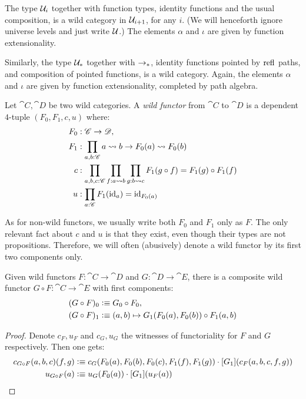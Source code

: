 \documentclass[english,a4paper]{lmcs}
\begin{document}
\begin{exa}
  The type $\mathcal{U}_i$ together with function types, identity functions and the
	usual composition, is a wild category in $\mathcal{U}_{i+1}$, for any $i$. (We will henceforth ignore universe levels and just write $\mathcal{U}$.) The elements $\alpha$ and $\iota$ are
  given by function extensionality.

  Similarly, the type $\mathcal{U}_*$ together with $\to_\ast$, identity functions
  pointed by $\mathop{{\mathrm{refl}}_{}}$ paths, and composition of pointed functions, is a wild
  category. Again, the elements $\alpha$ and $\iota$ are given by function
  extensionality, completed by path algebra.
\end{exa}

\begin{defi}
  Let $\cat C,\cat D$ be two wild categories.
  A \emph{wild functor} from $\cat C$ to $\cat D$ is a dependent $4$-tuple $(F_0,F_1,c,u)$ where:
  \begin{align*}
    F_0 &:\cat C \to \cat D,\\
    F_1 &:\prod_{a,b:\cat C} \hom(a,b) \to \hom(F_0(a), F_0(b))\\
    c &: \prod_{a,b,c:\cat C}\prod_{f:\hom(a,b)}\prod_{g:\hom(b,c)}F_1(g\circ f) = F_1(g) \circ F_1(f)\\
    u &: \prod_{a:\cat C} F_1(\id_a) = \id_{F_0(a)}
  \end{align*}
  \label{def:wild-functor}
\end{defi}

As for non-wild functors, we usually write both $F_0$ and $ F_1$ only as $F$.
The only relevant fact about $c$ and $u$ is that they exist, even though their
types are not propositions. Therefore, we will often (abusively) denote a wild
functor by its first two components only.

\begin{prop}
  Given wild functors $F:\cat C \to \cat D$ and $G:\cat D \to \cat E$, there is a composite wild functor $G\circ F :\cat C \to \cat E$ with first components:
  \begin{align*}
    (G\circ F)_0 &\vcentcolon\equiv G_0\circ F_0, \\
    (G\circ F)_1 &\vcentcolon\equiv (a,b) \mapsto G_1(F_0(a),F_0(b)) \circ F_1(a,b)
  \end{align*}
  \label{prop:composition-wild-functors}
\end{prop}
\begin{proof}
  Denote $c_F, u_F$ and $c_G,u_G$ the witnesses of functoriality for $F$ and
  $G$ respectively. Then one gets:
  \begin{align*}
    c_{G\circ F}(a,b,c)(f,g) &\vcentcolon\equiv c_G(F_0(a),F_0(b),F_0(c),F_1(f),F_1(g)) \cdot \mathop{\left[{G_1}\right]} ( c_F(a,b,c,f,g) ) \\
    u_{G\circ F}(a) &\vcentcolon\equiv u_G(F_0(a)) \cdot \mathop{\left[{G_1}\right]} (u_F(a))\qedhere
  \end{align*}
\end{proof}
\end{document}
